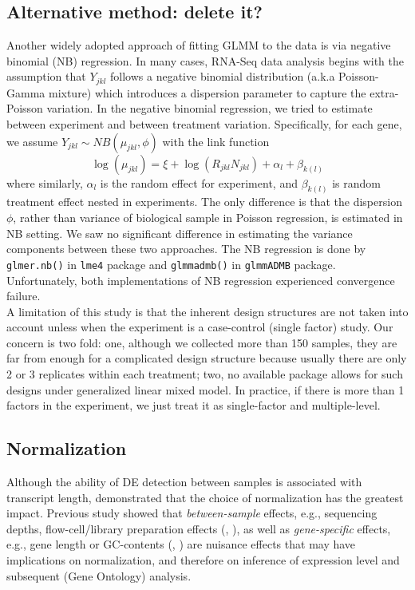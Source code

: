 \documentclass[11pt, a4paper]{article}
\begin{document}
  \subsection{Alternative method:  delete it?}
Another widely adopted approach of fitting GLMM to the data is via negative binomial (NB) regression. In many cases,  RNA-Seq data analysis begins with the assumption that $Y_{jkl}$ follows a negative binomial distribution (a.k.a Poisson-Gamma mixture) which introduces a dispersion parameter to capture the extra-Poisson variation.  In the negative binomial regression, we tried to estimate between experiment and between treatment variation. Specifically,  for each gene, we assume $Y_{jkl}\sim NB(\mu_{jkl}, \phi)$ with the link function
 \[\log(\mu_{jkl})= \xi + \log(R_{jkl}N_{jkl}) + \alpha_l + \beta_{k(l)}\]
where similarly, $\alpha_l$ is the random effect for experiment, and $\beta_{k(l)}$ is random treatment effect nested in experiments.  The only difference is that the dispersion $\phi$, rather than variance of biological sample in Poisson regression, is estimated in NB setting. We saw no significant difference in estimating the variance components between these two approaches. The NB regression is done by \verb"glmer.nb()" in \verb"lme4" package\citep{bates2012lme4} and \verb"glmmadmb()" in \verb"glmmADMB" package\citep{bolker2012getting}. Unfortunately, both implementations of NB regression experienced convergence failure. \\

A limitation of this study is that the inherent design structures are not taken into account unless when the experiment is a case-control (single factor) study. Our concern is two fold: one, although we collected more than 150 samples, they are far from enough for a complicated design structure because usually there are only 2 or 3 replicates within each treatment;  two, no available package allows for such designs under generalized linear mixed model.  In practice, if there is more than 1 factors in the experiment, we just treat it as single-factor and multiple-level. 


\subsection{Normalization}

Although the ability of DE detection between samples is associated with transcript length\citep{oshlack2009transcript}, \cite{bullard2010evaluation} demonstrated that the choice of normalization has the greatest impact. Previous study showed that \textit{between-sample} effects, e.g., sequencing depths, flow-cell/library preparation effects (\cite{bullard2010evaluation}, \cite{robinson2010scaling}), as well as \textit{gene-specific} effects, e.g.,  gene length or GC-contents (\cite{risso2011gc}, \cite{hansen2012removing}) are nuisance effects that may have implications on normalization, and therefore on inference of expression level and subsequent (Gene Ontology) analysis.  \\
\end{document}
